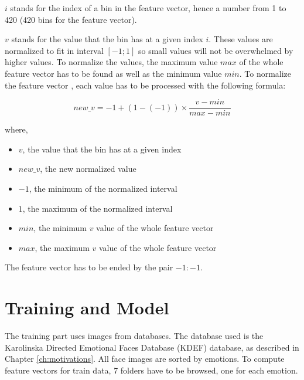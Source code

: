 \vspace{\baselineskip}
\noindent $ i $ stands for the index of a bin in the feature vector, hence a number from 1 to 420 (420 bins for the feature vector).
\newline

\vspace{\baselineskip}
\noindent $ v $ stands for the value that the bin has at a given index $i$. These values are normalized to fit in interval $ [-1;1] $ so small values will not be overwhelmed by higher values. To normalize the values, the maximum value $max$ of the whole feature vector has to be found as well as the minimum value $min$. To normalize the feature vector , each value has to be processed with the following formula: 
\newline

\begin{equation}
new\_v = -1 + (1 - (-1))\times\frac{v - min}{max - min}
\end{equation}

\noindent where,

\begin{itemize}
  \item $ v $, the value that the bin has at a given index
  \item $ new\_v $, the new normalized value
  \item $ -1 $, the minimum of the normalized interval
  \item $ 1 $, the maximum of the normalized interval
  \item $ min $, the minimum $ v $ value of the whole feature vector
  \item $ max $, the maximum $ v $ value of the whole feature vector
\end{itemize}

\vspace{\baselineskip}
\noindent The feature vector has to be ended by the pair $ -1:-1 $.

\section{Training and Model}

\vspace{\baselineskip}
\noindent The training part uses images from databases. The database used is the Karolinska Directed Emotional Faces Database (KDEF) database, as described in Chapter \ref{ch:motivations}. All face images are sorted by emotions. To compute feature vectors for train data, 7 folders have to be browsed, one for each emotion.
\newline

